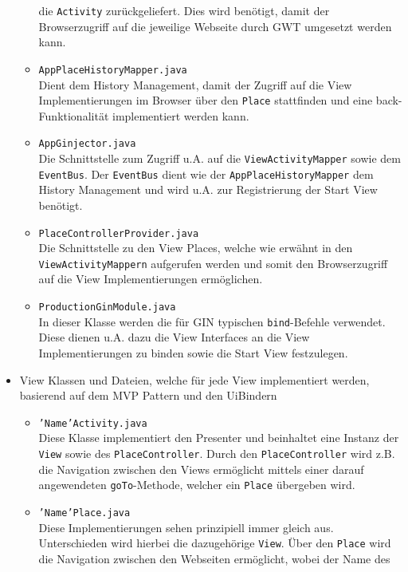 \begin{itemize}
\begin{itemize}
    die \texttt{Activity} zurückgeliefert. Dies wird benötigt, damit der
    Browserzugriff auf die jeweilige Webseite durch GWT umgesetzt werden kann.
    \item \texttt{AppPlaceHistoryMapper.java}\\
    Dient dem History Management, damit der Zugriff auf die View
    Implementierungen im Browser über den \texttt{Place} stattfinden und eine
    back-Funktionalität implementiert werden kann.
    \item \texttt{AppGinjector.java}\\
    Die Schnittstelle zum Zugriff u.A. auf die
    \texttt{ViewActivityMapper} sowie dem \texttt{EventBus}. Der
    \texttt{EventBus} dient wie der \texttt{AppPlaceHistoryMapper} dem
    History Management und wird u.A. zur Registrierung der Start View benötigt.
    \item \texttt{PlaceControllerProvider.java}\\
    Die Schnittstelle zu den View Places, welche wie erwähnt in
    den \texttt{ViewActivityMappern} aufgerufen werden und somit den
    Browserzugriff auf die View Implementierungen ermöglichen.
    \item \texttt{ProductionGinModule.java}\\
    In dieser Klasse werden die für GIN typischen \texttt{bind}-Befehle
    verwendet. Diese dienen u.A. dazu die View Interfaces an die View
    Implementierungen zu binden sowie die Start View festzulegen.
  \end{itemize}  
  \item View Klassen und Dateien, welche für jede View implementiert werden,
  basierend auf dem MVP Pattern und den UiBindern
    \begin{itemize}
    \item \texttt{'Name'Activity.java}\\
    Diese Klasse implementiert den Presenter und beinhaltet
    eine Instanz der \texttt{View} sowie des \texttt{PlaceController}.
    Durch den \texttt{PlaceController} wird z.B. die Navigation zwischen den Views
    ermöglicht mittels einer darauf angewendeten \texttt{goTo}-Methode, welcher
 	ein \texttt{Place} übergeben wird.
    \item \texttt{'Name'Place.java}\\
    Diese Implementierungen sehen prinzipiell immer gleich aus. Unterschieden
    wird hierbei die dazugehörige \texttt{View}. Über den \texttt{Place} wird
    die Navigation zwischen den Webseiten ermöglicht, wobei der Name des

\end{itemize}
\end{itemize}
